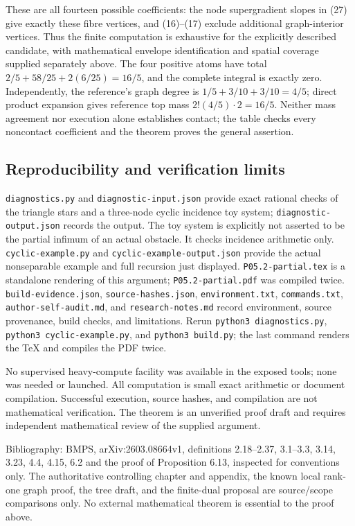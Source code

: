\documentclass[
  11pt,
]{article}
\begin{document}
These are all fourteen possible coefficients: the node supergradient
slopes in (27) give exactly these fibre vertices, and (16)--(17) exclude
additional graph-interior vertices. Thus the finite computation is
exhaustive for the explicitly described candidate, with mathematical
envelope identification and spatial coverage supplied separately above.
The four positive atoms have total \(2/5+58/25+2(6/25)=16/5\), and the
complete integral is exactly zero. Independently, the reference's graph
degree is \(1/5+3/10+3/10=4/5\); direct product expansion gives
reference top mass \(2!(4/5)\cdot2=16/5\). Neither mass agreement nor
execution alone establishes contact; the table checks every noncontact
coefficient and the theorem proves the general assertion.

\subsection{Reproducibility and verification
limits}\label{reproducibility-and-verification-limits}

\texttt{diagnostics.py} and \texttt{diagnostic-input.json} provide exact
rational checks of the triangle stars and a three-node cyclic incidence
toy system; \texttt{diagnostic-output.json} records the output. The toy
system is explicitly not asserted to be the partial infimum of an actual
obstacle. It checks incidence arithmetic only.
\texttt{cyclic-example.py} and \texttt{cyclic-example-output.json}
provide the actual nonseparable example and full recursion just
displayed. \texttt{P05.2-partial.tex} is a standalone rendering of this
argument; \texttt{P05.2-partial.pdf} was compiled twice.
\texttt{build-evidence.json}, \texttt{source-hashes.json},
\texttt{environment.txt}, \texttt{commands.txt},
\texttt{author-self-audit.md}, and \texttt{research-notes.md} record
environment, source provenance, build checks, and limitations. Rerun
\texttt{python3\ diagnostics.py}, \texttt{python3\ cyclic-example.py},
and \texttt{python3\ build.py}; the last command renders the TeX and
compiles the PDF twice.

No supervised heavy-compute facility was available in the exposed tools;
none was needed or launched. All computation is small exact arithmetic
or document compilation. Successful execution, source hashes, and
compilation are not mathematical verification. The theorem is an
unverified proof draft and requires independent mathematical review of
the supplied argument.

Bibliography: BMPS, arXiv:2603.08664v1, definitions 2.18--2.37,
3.1--3.3, 3.14, 3.23, 4.4, 4.15, 6.2 and the proof of Proposition 6.13,
inspected for conventions only. The authoritative controlling chapter
and appendix, the known local rank-one graph proof, the tree draft, and
the finite-dual proposal are source/scope comparisons only. No external
mathematical theorem is essential to the proof above.
\end{document}
